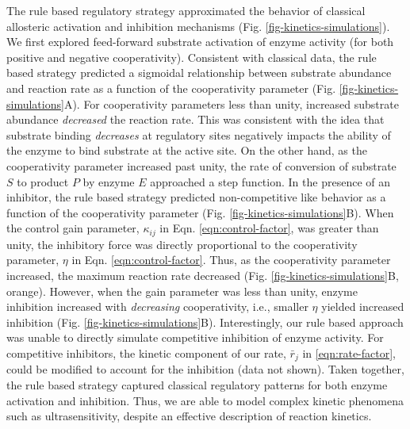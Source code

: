\documentclass[12pt]{article}
\begin{document}
The rule based regulatory strategy approximated the behavior of classical allosteric activation and inhibition mechanisms (Fig. \ref{fig-kinetics-simulations}).  
We first explored feed-forward substrate activation of enzyme activity (for both positive and negative cooperativity). 
Consistent with classical data, the rule based strategy predicted a sigmoidal relationship between substrate abundance 
and reaction rate as a function of the cooperativity parameter (Fig. \ref{fig-kinetics-simulations}A). 
For cooperativity parameters less than unity, increased substrate abundance \textit{decreased} the reaction rate. This was consistent with the idea that
substrate binding \textit{decreases} at regulatory sites negatively impacts the ability of the enzyme to bind substrate at the active site. 
On the other hand, as the cooperativity parameter increased past unity, the rate of conversion of substrate $S$ to product $P$ by enzyme $E$ approached a step function.
In the presence of an inhibitor, the rule based strategy predicted non-competitive like behavior as a function of the 
cooperativity parameter (Fig. \ref{fig-kinetics-simulations}B). 
When the control gain parameter, $\kappa_{ij}$ in Eqn. \eqref{eqn:control-factor}, was greater than unity, the inhibitory force was
directly proportional to the cooperativity parameter, $\eta$ in Eqn. \eqref{eqn:control-factor}. 
Thus, as the cooperativity parameter increased, the maximum reaction rate decreased (Fig. \ref{fig-kinetics-simulations}B, orange).
However, when the gain parameter was less than unity, enzyme inhibition increased with \textit{decreasing} cooperativity, 
i.e., smaller $\eta$ yielded increased inhibition (Fig. \ref{fig-kinetics-simulations}B).
Interestingly, our rule based approach was unable to directly simulate competitive inhibition of enzyme activity. 
For competitive inhibitors, the kinetic component of our rate, $\bar{r}_{j}$ in \eqref{eqn:rate-factor}, could be modified to account 
for the inhibition (data not shown). 
Taken together, the rule based strategy captured classical regulatory patterns for both enzyme activation and inhibition. 
Thus, we are able to model complex kinetic phenomena such as ultrasensitivity, despite an effective description of reaction kinetics. 
    
\end{document}
